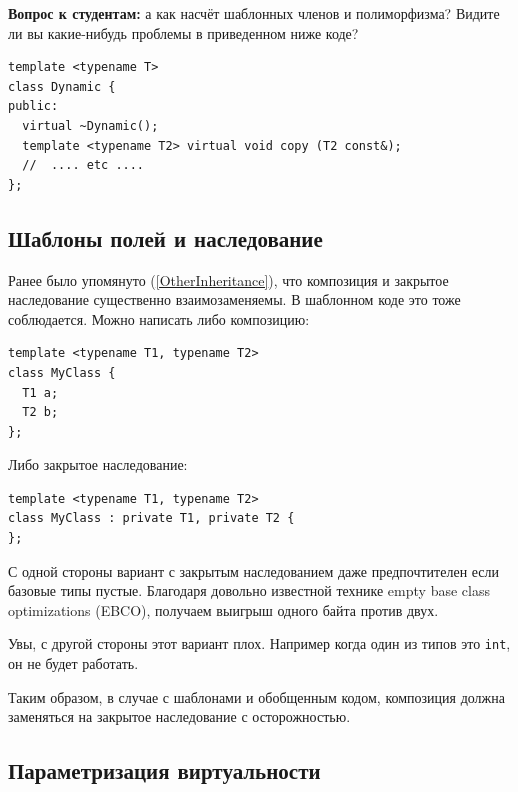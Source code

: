 \documentclass[a4paper,12pt,oneside]{book}
\newif\ifanswers
\begin{document}
\textbf{Вопрос к студентам:} а как насчёт шаблонных членов и полиморфизма? Видите ли вы какие-нибудь проблемы в приведенном ниже коде?

\begin{lstlisting}
template <typename T> 
class Dynamic { 
public: 
  virtual ~Dynamic();
  template <typename T2> virtual void copy (T2 const&); 
  //  .... etc ....
};
\end{lstlisting}

\ifanswers
Правильный ответ: да, проблемы есть. Обычный механизм виртуальных функций полагается на виртуальные таблицы фиксированного размера, однако количество актуальных экземпляров шаблонного метода может быть любым. Поэтому такие трюки в языке запрещены.
\fi

\subsection{Шаблоны полей и наследование}\label{TemplPrivate}

Ранее было упомянуто (\ref{OtherInheritance}), что композиция и закрытое наследование существенно взаимозаменяемы. В шаблонном коде это тоже соблюдается. Можно написать либо композицию:

\begin{lstlisting}
template <typename T1, typename T2> 
class MyClass { 
  T1 a; 
  T2 b; 
}; 
\end{lstlisting}

Либо закрытое наследование:

\begin{lstlisting}
template <typename T1, typename T2> 
class MyClass : private T1, private T2 { 
}; 
\end{lstlisting}

С одной стороны вариант с закрытым наследованием даже предпочтителен если базовые типы пустые. Благодаря довольно известной технике empty base class optimizations (EBCO), получаем выигрыш одного байта против двух.

Увы, с другой стороны этот вариант плох. Например когда один из типов это \lstinline!int!, он не будет работать.

Таким образом, в случае с шаблонами и обобщенным кодом, композиция должна заменяться на закрытое наследование с осторожностью.

\subsection{Параметризация виртуальности}
\end{document}
